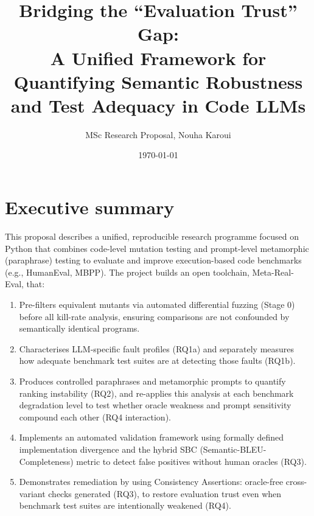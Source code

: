 \documentclass[11pt,a4paper]{article}
\title{\textbf{Bridging the ``Evaluation Trust'' Gap:\\ A Unified Framework for Quantifying Semantic Robustness and Test Adequacy in Code LLMs}}
\author{MSc Research Proposal, Nouha Karoui}
\date{\today}
\begin{document}
\maketitle

\section*{Executive summary}

This proposal describes a unified, reproducible research programme focused on Python that combines code-level mutation testing and prompt-level metamorphic (paraphrase) testing to evaluate and improve execution-based code benchmarks (e.g., HumanEval, MBPP). The project builds an open toolchain, Meta-Real-Eval, that:
\begin{enumerate}[noitemsep]
    \item Pre-filters equivalent mutants via automated differential fuzzing (Stage 0) before all kill-rate analysis, ensuring comparisons are not confounded by semantically identical programs.
    \item Characterises LLM-specific fault profiles (RQ1a) and separately measures how adequate benchmark test suites are at detecting those faults (RQ1b).
    \item Produces controlled paraphrases and metamorphic prompts to quantify ranking instability (RQ2), and re-applies this analysis at each benchmark degradation level to test whether oracle weakness and prompt sensitivity compound each other (RQ4 interaction).
    \item Implements an automated validation framework using formally defined implementation divergence and the hybrid SBC (Semantic-BLEU-Completeness) metric to detect false positives without human oracles (RQ3).
    \item Demonstrates remediation by using Consistency Assertions: oracle-free cross-variant checks generated (RQ3), to restore evaluation trust even when benchmark test suites are intentionally weakened (RQ4).
\end{enumerate}
\end{document}
